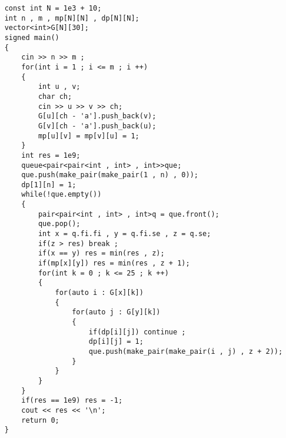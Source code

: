 \documentclass[E:/GsjzTle/main/main.tex]{subfiles}
\begin{document}
\begin{lstlisting}
	const int N = 1e3 + 10;
	int n , m , mp[N][N] , dp[N][N]; 
	vector<int>G[N][30]; 
	signed main()
	{
		cin >> n >> m ;
		for(int i = 1 ; i <= m ; i ++)
		{
			int u , v;
			char ch;
			cin >> u >> v >> ch;
			G[u][ch - 'a'].push_back(v);
			G[v][ch - 'a'].push_back(u);
			mp[u][v] = mp[v][u] = 1;
		}
		int res = 1e9;
		queue<pair<pair<int , int> , int>>que;
		que.push(make_pair(make_pair(1 , n) , 0));
		dp[1][n] = 1;
		while(!que.empty())
		{
			pair<pair<int , int> , int>q = que.front();
			que.pop();
			int x = q.fi.fi , y = q.fi.se , z = q.se;
			if(z > res) break ;
			if(x == y) res = min(res , z);
			if(mp[x][y]) res = min(res , z + 1);
			for(int k = 0 ; k <= 25 ; k ++)
			{
				for(auto i : G[x][k])
				{
					for(auto j : G[y][k])
					{
						if(dp[i][j]) continue ;
						dp[i][j] = 1;
						que.push(make_pair(make_pair(i , j) , z + 2));
					}
				}
			}
		}
		if(res == 1e9) res = -1;
		cout << res << '\n';
		return 0;
	}
\end{lstlisting}
\end{document}
